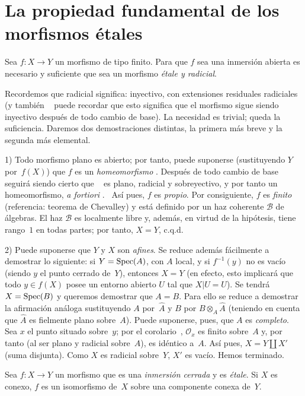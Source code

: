 \section{La propiedad fundamental de los morfismos étales}
\label{I.5}

\begin{theoreme}
\label{I.5.1}
Sea $f\colon X\to Y$ un morfismo de tipo finito. Para que $f$ sea una inmersión abierta es necesario y suficiente que sea un morfismo \emph{étale y radicial}.
\end{theoreme}

Recordemos que radicial
%
significa: inyectivo, con extensiones residuales radiciales (y también \ %
puede recordar que esto significa que el morfismo sigue siendo inyectivo después de todo cambio de base). La necesidad es trivial; queda la suficiencia. Daremos dos demostraciones distintas, la primera más breve y la segunda más elemental.

1) Todo morfismo plano es abierto; por tanto, puede suponerse (sustituyendo $Y$ por~$f(X)$) que $f$ es un \emph{homeomorfismo} . Después de todo cambio de base seguirá siendo cierto que \ %
es plano, radicial y sobreyectivo, y por tanto un homeomorfismo, \emph{a fortiori} .\ %
Así pues, $f$ es \emph{propio}. Por consiguiente, $f$ es \emph{finito} (referencia: teorema de Chevalley) y está definido por un haz coherente $\mathcal{B}$ de álgebras. El haz $\mathcal{B}$ es localmente libre y, además, en virtud de la hipótesis, tiene rango~$1$ en todas partes; por tanto, $X=Y$, c.q.d.

2) Puede suponerse que $Y$ y $X$ son \emph{afines}. Se reduce además fácilmente a demostrar lo siguiente: si $Y=\operatorname{Spec}(A)$, con $A$ local, y si $f^{-1}(y)$ no es vacío (siendo $y$ el punto cerrado de~$Y$), entonces $X=Y$ (en efecto, esto implicará que todo $y\in f(X)$ posee un entorno abierto $U$ tal que $X|U=U$). Se tendrá $X=\operatorname{Spec}(B)$ y queremos demostrar que $A=B$. Para ello se reduce a demostrar la afirmación análoga sustituyendo $A$ por~$\hat A$ y $B$ por $B\otimes_A\hat A$ (teniendo en cuenta que $\hat A$ es fielmente plano sobre~$A$). Puede suponerse, pues, que $A$ es \emph{completo}. Sea $x$ el punto situado sobre~$y$; por el corolario~, $\mathcal{O}_x$ es finito sobre~$A$ y, por tanto (al ser plano y radicial sobre~$A$), es idéntico a~$A$. Así pues, $X=Y\amalg X'$ (suma disjunta). Como $X$ es radicial sobre~$Y$, $X'$ es vacío. Hemos terminado.
{\enlargethispage{.5cm}}%
\begin{corollaire}
\label{I.5.2}
Sea $f\colon X\to Y$ un morfismo que es una \emph{inmersión cerrada} y es \emph{étale}. Si $X$ es conexo, $f$ es un isomorfismo de~$X$ sobre una componente conexa de~$Y$.
\end{corollaire}

